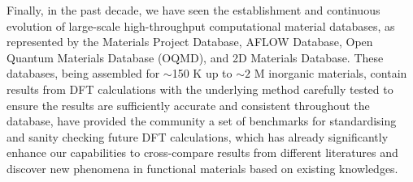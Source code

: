 Finally, in the past decade, we have seen the establishment and continuous evolution of large-scale high-throughput computational material databases, as represented by the Materials Project Database,\cite{jain_apl_mater} AFLOW Database,\cite{CURTAROLO2012218} Open Quantum Materials Database (OQMD),\cite{kirklin2015open} and 2D Materials Database.\cite{haastrup2018,gjerding2021recent} These databases, being assembled for $\sim$150 K up to $\sim 2$ M inorganic materials, contain results from DFT calculations with the underlying method carefully tested to ensure the results are sufficiently accurate and consistent throughout the database, have provided the community a set of benchmarks for standardising and sanity checking future DFT calculations, which has already significantly enhance our capabilities to cross-compare results from different literatures and discover new phenomena in functional materials based on existing knowledges.